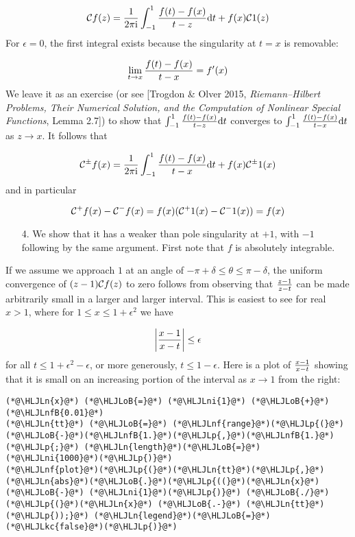 \documentclass[12pt,landscape]{article}
\newcommand{\HLJLkc}[1]{\textcolor[RGB]{59,151,46}{\textit{#1}}}
\newcommand{\HLJLn}[1]{#1}
\newcommand{\HLJLnf}[1]{\textcolor[RGB]{66,102,213}{#1}}
\newcommand{\HLJLnfB}[1]{\textcolor[RGB]{59,151,46}{#1}}
\newcommand{\HLJLni}[1]{\textcolor[RGB]{59,151,46}{#1}}
\newcommand{\HLJLoB}[1]{\textcolor[RGB]{102,102,102}{\textbf{#1}}}
\newcommand{\HLJLp}[1]{#1}
\def\D{ {\rm d} }
\def\I{ {\rm i} }
\def\CC{ {\cal C} }
\def\dt{\D t}
\begin{document}
{\[
    {\cal C} f(z) =   {1 \over 2 \pi \I} \int_{-1}^1 {f(t) - f(x) \over t - z} \dt + f(x) \CC 1(z)
\]
For $\epsilon = 0$, the first integral exists because the singularity at $t = x$ is removable:

\[
\lim_{t \rightarrow x} {f(t) - f(x) \over t - x} = f'(x)
\]
We leave it as an exercise (or see [Trogdon \& Olver 2015, \emph{Riemann--Hilbert Problems, Their Numerical Solution, and the Computation of Nonlinear Special Functions}, Lemma 2.7]) to show that $\int_{-1}^1 {f(t) - f(x) \over t - z} \dt$ converges to $\int_{-1}^1 {f(t) - f(x) \over t - x} \dt$ as $z \rightarrow x$. It follows that

\[
{\cal C}^\pm f(x) =   {1 \over 2 \pi \I} \int_{-1}^1 {f(t) - f(x) \over t - x} \dt + f(x) \CC^\pm 1(x)
\]
and in particular

\[
{\cal C}^+ f(x) - {\cal C}^- f(x)  =  f(x) (\CC^+ 1(x) - \CC^- 1(x)) = f(x)
\]
\begin{itemize}
\newpage
\item[4. ] We show that it has a weaker than pole singularity at $+1$, with $-1$ following by the same argument. First note that $f$ is absolutely integrable.

\end{itemize}
If we assume we approach $1$ at an angle of $-\pi + \delta \leq \theta \leq \pi - \delta$, the uniform convergence of $(z - 1) \CC f(z)$ to zero follows from observing that ${z-1 \over z - t}$ can be made arbitrarily small in a larger and larger interval. This is easiest to see for real $x > 1$, where for  $1 \leq x \leq 1 + \epsilon^2$ we have

\[
\left|{x -1 \over x-t }\right| \leq \epsilon
\]
for all $t \leq 1 + \epsilon^2 - \epsilon$, or more generously, $t \leq 1 - \epsilon$. Here is a plot of ${x - 1 \over x- t}$ showing that it is small on an increasing portion of the interval as $x \rightarrow 1$ from the right:


\begin{lstlisting}
(*@\HLJLn{x}@*) (*@\HLJLoB{=}@*) (*@\HLJLni{1}@*) (*@\HLJLoB{+}@*) (*@\HLJLnfB{0.01}@*)
(*@\HLJLn{tt}@*) (*@\HLJLoB{=}@*) (*@\HLJLnf{range}@*)(*@\HLJLp{(}@*)(*@\HLJLoB{-}@*)(*@\HLJLnfB{1.}@*)(*@\HLJLp{,}@*)(*@\HLJLnfB{1.}@*)(*@\HLJLp{;}@*) (*@\HLJLn{length}@*)(*@\HLJLoB{=}@*)(*@\HLJLni{1000}@*)(*@\HLJLp{)}@*)
(*@\HLJLnf{plot}@*)(*@\HLJLp{(}@*)(*@\HLJLn{tt}@*)(*@\HLJLp{,}@*) (*@\HLJLn{abs}@*)(*@\HLJLoB{.}@*)(*@\HLJLp{((}@*)(*@\HLJLn{x}@*) (*@\HLJLoB{-}@*) (*@\HLJLni{1}@*)(*@\HLJLp{)}@*) (*@\HLJLoB{./}@*) (*@\HLJLp{(}@*)(*@\HLJLn{x}@*) (*@\HLJLoB{.-}@*) (*@\HLJLn{tt}@*)(*@\HLJLp{));}@*) (*@\HLJLn{legend}@*)(*@\HLJLoB{=}@*)(*@\HLJLkc{false}@*)(*@\HLJLp{)}@*)
\end{lstlisting}

}
\end{document}
